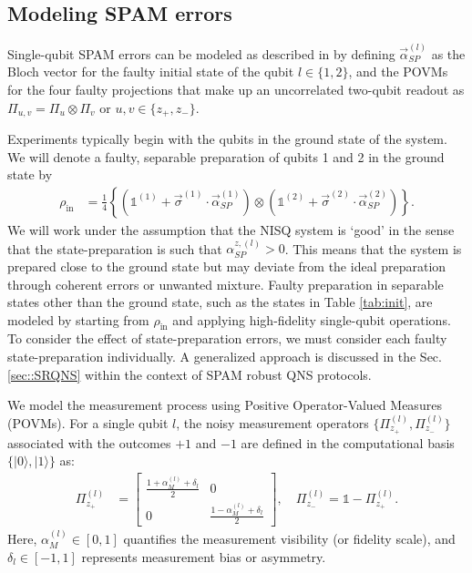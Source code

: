 \documentclass[%
 reprint,
superscriptaddress,
 amsmath,amssymb,
 aps,
pra,
]{revtex4-2}
\begin{document}
\subsection{Modeling SPAM errors}
Single-qubit SPAM errors can be modeled as described in \cite{PhysRevApplied.22.024074} by defining $\vec{\alpha}^{(l)}_{SP}$ as the Bloch vector for the faulty initial state of the qubit $l\in\{1,2\}$, and the POVMs for the four faulty projections that make up an uncorrelated two-qubit readout as $\Pi_{u,v}=\Pi_u\otimes\Pi_v$ or $u,v\in\{z_+,z_-\}$.

Experiments typically begin with the qubits in the ground state of the system. We will denote a faulty, separable preparation of qubits 1 and 2 in the ground state by
\begin{align}
    \rho_\text{in}&=\frac{1}{4}\left\{(\mathbb{1}^{(1)}+\vec{\sigma}^{(1)}\cdot\vec\alpha^{(1)}_{SP})\otimes(\mathbb{1}^{(2)}+\vec{\sigma}^{(2)}\cdot\vec\alpha^{(2)}_{SP})\right\}.
\end{align}
We will work under the assumption that the NISQ system is `good' in the sense that the state-preparation is such that $\alpha^{z,(l)}_{SP}>0$. This means that the system is prepared close to the ground state but may deviate from the ideal preparation through coherent errors or unwanted mixture. Faulty preparation in separable states other than the ground state, such as the states in Table \ref{tab:init}, are modeled by starting from $\rho_\text{in}$ and applying high-fidelity single-qubit operations. To consider the effect of state-preparation errors, we must consider each faulty state-preparation individually. A generalized approach is discussed in the Sec. \ref{sec::SRQNS} within the context of SPAM robust QNS protocols.

We model the measurement process using Positive Operator-Valued Measures (POVMs). For a single qubit $l$, the noisy measurement operators $\{\Pi^{(l)}_{z_+}, \Pi^{(l)}_{z_-}\}$ associated with the outcomes $+1$ and $-1$ are defined in the computational basis $\{|0\rangle, |1\rangle\}$ as:
\begin{align}
    \Pi^{(l)}_{z_+}&=\begin{bmatrix}
        \frac{1+\alpha^{(l)}_M+\delta_l}{2} & 0\\
        0 & \frac{1-\alpha^{(l)}_M+\delta_l}{2}
    \end{bmatrix}, \quad
    \Pi^{(l)}_{z_-} = \mathbb{1} - \Pi^{(l)}_{z_+}.
\end{align}
Here, $\alpha_M^{(l)} \in [0,1]$ quantifies the measurement visibility (or fidelity scale), and $\delta_l \in [-1,1]$ represents measurement bias or asymmetry. 
\end{document}
